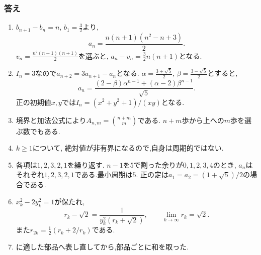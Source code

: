   \subsubsection{答え}
  \begin{enumerate}[label=\textbf{問\arabic*.},format=\bookitemlink{practice-connections}{answer}{problem}]
    \item $b_{n+1}-b_n=n$, $b_1=\frac32$より,
      \[
        a_n=\frac{n(n+1)(n^2-n+3)}2.
      \]
      $v_n=\frac{n^2(n-1)(n+1)}2$を選ぶと,
      $a_n-v_n=\frac32n(n+1)$となる.
    \item $I_n=3$なので$a_{n+2}=3a_{n+1}-a_n$となる.
      $\alpha=\frac{3+\sqrt5}{2}$, $\beta=\frac{3-\sqrt5}{2}$とすると,
      \[
        a_n=\frac{(2-\beta)\alpha^{n-1}+(\alpha-2)\beta^{n-1}}{\sqrt5}.
      \]
      正の初期値$x,y$では$I_n=(x^2+y^2+1)/(xy)$となる.
    \item 境界と加法公式により$A_{n,m}=\binom{n+m}{m}$である.
      $n+m$歩から上への$m$歩を選ぶ数でもある.
    \item $k\ge1$について,
      \BookMathLayout{\[
        a_{2k-1}=\frac{1+5(-2)^{k-1}}3,\qquad
        a_{2k}=-\frac{1+5(-2)^{k-1}}3.
      \]}{\[
    \begin{aligned}
      a_{2k-1}&=\frac{1+5(-2)^{k-1}}3,\\
      a_{2k}&=-\frac{1+5(-2)^{k-1}}3.
    \end{aligned}
  \]}
      絶対値が非有界になるので,自身は周期的ではない.
    \item 各項は$1,2,3,2,1$を繰り返す.
      $n-1$を$5$で割った余りが$0,1,2,3,4$のとき,
      $a_n$はそれぞれ$1,2,3,2,1$である.最小周期は$5$.
      正の定は$a_1=a_2=(1+\sqrt5)/2$の場合である.
    \item $x_k^2-2y_k^2=1$が保たれ,
      \[
        r_k-\sqrt2=\frac1{y_k^2(r_k+\sqrt2)},\qquad
        \lim_{k\to\infty}r_k=\sqrt2.
      \]
      また$r_{2k}=\frac12(r_k+2/r_k)$である.
    \item
      \BookMathLayout{\[
        \sum_{j=0}^{N-1}j^3
          =6\binom N4+6\binom N3+\binom N2
          =\frac{N^2(N-1)^2}{4}.
      \]}{\[
    \begin{aligned}
      \sum_{j=0}^{N-1}j^3&=6\binom N4+6\binom N3+\binom N2\\
      &=\frac{N^2(N-1)^2}{4}.
    \end{aligned}
  \]}
      に適した部品へ表し直してから,部品ごとに和を取った.
  \end{enumerate}

